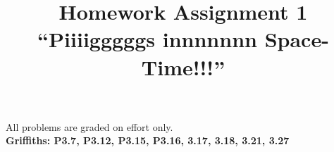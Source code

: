 \documentclass[12pt]{article}
\begin{document}
\newcommand{\ihbar}{\ensuremath{i \hbar}}
\newcommand{\dPsidt}{\ensuremath{ \frac{\partial \Psi}{\partial t} }}
\newcommand{\dPsidx}{\ensuremath{ \frac{\partial \Psi}{\partial x} }}
\newcommand{\ddPsidx}{\ensuremath{ \frac{\partial^2 \Psi}{\partial x^2} }}
\newcommand{\dPssdt}{\ensuremath{ \frac{\partial \Psi^*}{\partial t} }}
\newcommand{\dPssdx}{\ensuremath{ \frac{\partial \Psi^*}{\partial x} }}
\newcommand{\ddPssdx}{\ensuremath{ \frac{\partial^2 \Psi^*}{\partial x^2} }}

\newcommand{\dphidt}{\ensuremath{ \frac{d \phi}{dt} }}
\newcommand{\dpsidx}{\ensuremath{ \frac{d \psi}{dx} }}
\newcommand{\ddpsidx}{\ensuremath{ \frac{d^2 \psi}{dx^2} }}


\date{\vspace{-5ex}}

\title{Homework Assignment 1 \\ ``Piiiigggggs innnnnnn Space-Time!!!''}

\maketitle

\noindent
All problems are graded on effort only.\\

\noindent
{\bf Griffiths: P3.7, P3.12, P3.15, P3.16, 3.17, 3.18, 3.21, 3.27} \\
  
\end{document}
